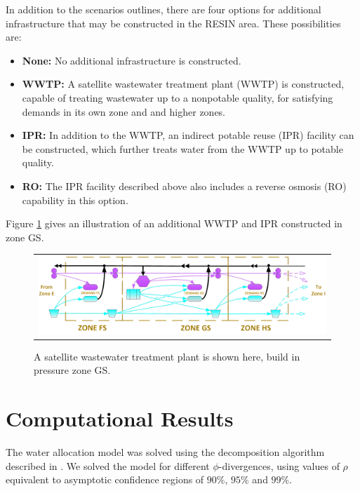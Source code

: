 \documentclass[opre,nonblindrev]{informs3} %
\begin{document}
In addition to the scenarios outlines, there are four options for additional infrastructure that may be constructed in the RESIN area.
These possibilities are:
\begin{itemize}
	\item \textbf{None:} No additional infrastructure is constructed.
	\item \textbf{WWTP:} A satellite wastewater treatment plant (WWTP) is constructed, capable of treating wastewater up to a nonpotable quality, for satisfying demands in its own zone and and higher zones.
	\item \textbf{IPR:} In addition to the WWTP, an indirect potable reuse (IPR) facility can be constructed, which further treats water from the WWTP up to potable quality.
	\item \textbf{RO:} The IPR facility described above also includes a reverse osmosis (RO) capability in this option.
\end{itemize}
Figure \ref{fig:tucson_zones_wwtp} gives an illustration of an additional WWTP and IPR constructed in zone GS.

\begin{figure}
	\FIGURE
	{%
		\begin{tabular}{c}
			\includegraphics*[width=.8\textwidth]{tucson_water_images/zones_south_ipr.png}%
		\end{tabular}
	}
	{
		A satellite wastewater treatment plant is shown here, build in pressure zone GS.
		\label{fig:tucson_zones_wwtp}
	}
	{}
\end{figure}



\section{Computational Results}
\label{sec:comp}

The water allocation model was solved using the decomposition algorithm described in \cite{love2013phi}.
We solved the model for different $\phi$-divergences, using values of $\rho$ equivalent to asymptotic confidence regions of $90\%$, $95\%$ and $99\%$.
\end{document}
